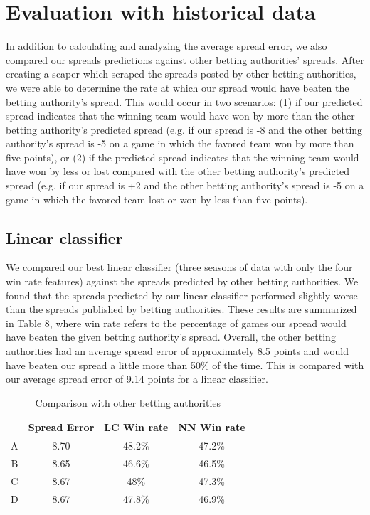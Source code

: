 \documentclass{article}
\begin{document}
\section{Evaluation with historical data}
In addition to calculating and analyzing the average spread error, we also compared our spreads predictions against other betting authorities' spreads. After creating a scaper which scraped the spreads posted by other betting authorities, we were able to determine the rate at which our spread would have beaten the betting authority's spread. This would occur in two scenarios: (1) if our predicted spread indicates that the winning team would have won by more than the other betting authority's predicted spread (e.g. if our spread is -8 and the other betting authority's spread is -5 on a game in which the favored team won by more than five points), or (2) if the predicted spread indicates that the winning team would have won by less or lost compared with the other betting authority's predicted spread (e.g. if our spread is +2 and the other betting authority's spread is -5 on a game in which the favored team lost or won by less than five points).

\subsection{Linear classifier}
We compared our best linear classifier (three seasons of data with only the four win rate features) against the spreads predicted by other betting authorities. We found that the spreads predicted by our linear classifier performed slightly worse than the spreads published by betting authorities. These results are summarized in Table 8, where win rate refers to the percentage of games our spread would have beaten the given betting authority's spread. Overall, the other betting authorities had an average spread error of approximately 8.5 points and would have beaten our spread a little more than 50\% of the time. This is compared with our average spread error of 9.14 points for a linear classifier.

\begin{table}
  \begin{center}
    \begin{tabular}{ | c | c | c | c| }
      \hline
                       & Spread Error      &LC  Win rate &NN Win rate \\ \hline
       A      & 8.70              & 48.2\% &47.2\%   \\ \hline
      B      & 8.65              & 46.6\%  &46.5\%  \\ \hline
      C      & 8.67              & 48\%      &47.3\%	\\ \hline
	D      & 8.67              & 47.8\%    &46.9\%\\ \hline
    \end{tabular}
  \end{center}
  \caption{Comparison with other betting authorities}
\end{table}
\end{document}
